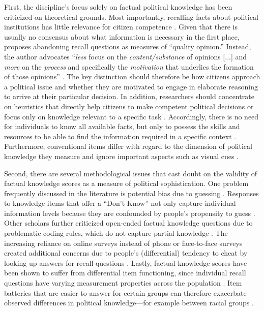 First, the discipline's focus solely on factual political knowledge has been criticized on theoretical grounds. Most importantly, recalling facts about political institutions  has little relevance for citizen competence \citep{lupia2006elitism,cramer2017fact}. Given that there is usually no consensus about what information is necessary in the first place, \citet{druckman2014pathologies} proposes abandoning recall questions as measures of ``quality opinion.'' Instead, the author advocates ``\textit{less} focus on the \textit{content/substance} of opinions [...] and \textit{more} on the \textit{process} and specifically the \textit{motivation} that underlies the formation of those opinions'' \citeyearpar[478, emphasis in the original]{druckman2014pathologies}. The key distinction should therefore be how citizens approach a political issue and whether they are motivated to engage in elaborate reasoning to arrive at their particular decision. In addition, researchers should concentrate on heuristics that directly help citizens to make competent political decisions or focus only on knowledge relevant to a specific task \citep[see also][]{lupia1994shortcuts}. Accordingly, there is no need for individuals to know all available facts, but only to possess the skills and resources to be able to find the information required in a specific context \citep{prior2008money}. Furthermore, conventional items differ with regard to the dimension of political knowledge they measure \citep{barabas2014question} and ignore important aspects such as visual cues \citep{prior2014visual}.

Second, there are several methodological issues that cast doubt on the validity of factual knowledge scores as a measure of political sophistication. One problem frequently discussed in the literature is potential bias due to guessing \citep{mondak2000reconsidering,mondak2001asked,miller2008experimenting}. Responses to knowledge items that offer a ``Don't Know'' not only capture individual information levels because they are confounded by people's propensity to guess \citep[but see][]{luskin2011don}. Other scholars further criticized open-ended factual knowledge questions due to problematic coding rules, which do not capture partial knowledge \citep{krosnick2008problems,gibson2009knowing,debell2013harder}. The increasing reliance on online surveys instead of phone or face-to-face surveys created additional concerns due to people's (differential) tendency to cheat by looking up answers for recall questions \citep{clifford2016cheating,hohne2021looking,style2021does}. Lastly, factual knowledge scores have been shown to suffer from differential item functioning, since individual recall questions have varying measurement properties across the population \citep{pietryka2013analysis}. Item batteries that are easier to answer for certain groups can therefore exacerbate observed differences in political knowledge---for example between racial groups \citep{abrajano2014reexamining}.


